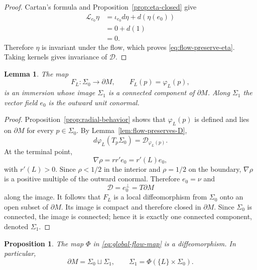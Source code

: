 \documentclass[11pt,a4paper]{article}
\numberwithin{equation}{section}
\newtheorem{lemma}[theorem]{Lemma}
\newtheorem{proposition}[theorem]{Proposition}
\newcommand{\Dcal}{\mathcal D}
\newcommand{\Lcal}{\mathcal L}
\begin{document}
\begin{proof}
Cartan's formula and Proposition~\ref{prop:eta-closed} give
\begin{align*}
        \Lcal_{e_0}\eta
        &=\iota_{e_0}d\eta+d(\eta(e_0))
        \\&=0+d(1)
        \\&=0.
\end{align*}
Therefore $\eta$ is invariant under the flow, which proves \eqref{eq:flow-preserve-eta}.  Taking kernels gives invariance of $\Dcal$.
\end{proof}

\begin{lemma}
The map
$$
        F_L:\Sigma_0\longrightarrow\partial M,
        \qquad
        F_L(p)=\varphi_L(p),
$$
is an immersion whose image $\Sigma_1$ is a connected component of
$\partial M$.  Along $\Sigma_1$ the vector field $e_0$ is the outward unit
conormal.
\end{lemma}

\begin{proof}
Proposition~\ref{prop:radial-behavior} shows that $\varphi_L(p)$ is defined and
lies on $\partial M$ for every $p\in\Sigma_0$.  By
Lemma~\ref{lem:flow-preserves-D},
$$
        d\varphi_L(T_p\Sigma_0)=\Dcal_{\varphi_L(p)}.
$$
At the terminal point,
$$
        \nabla\rho=rr'e_0=r'(L)e_0,
$$
with $r'(L)>0$.  Since $\rho<1/2$ in the interior and $\rho=1/2$ on the
boundary, $\nabla\rho$ is a positive multiple of the outward conormal.
Therefore $e_0=\nu$ and
$$
        \Dcal=e_0^\perp=T\partial M
$$
along the image.  It follows that $F_L$ is a local diffeomorphism from
$\Sigma_0$ onto an open subset of $\partial M$.  Its image is compact and
therefore closed in $\partial M$.  Since $\Sigma_0$ is connected, the image is
connected; hence it is exactly one connected component, denoted $\Sigma_1$.
\end{proof}

\begin{proposition}\label{prop:global-diffeomorphism}
The map $\Phi$ in \eqref{eq:global-flow-map} is a diffeomorphism.  In particular,
\begin{equation}\label{eq:two-boundaries}
        \partial M=\Sigma_0\sqcup\Sigma_1,
        \qquad
        \Sigma_1=\Phi(\{L\}\times\Sigma_0).
\end{equation}
\end{proposition}
\end{document}
